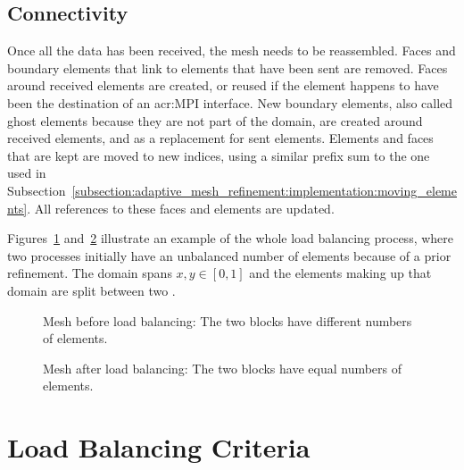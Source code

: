 \subsection{Connectivity}\label{subsection:load_balancing:reconstruction:connectivity}

Once all the data has been received, the mesh needs to be reassembled. Faces and boundary elements
that link to elements that have been sent are removed. Faces around received elements are created,
or reused if the element happens to have been the destination of an \acrshort{acr:MPI} interface.
New boundary elements, also called ghost elements because they are not part of the domain, are
created around received elements, and as a replacement for sent elements. Elements and faces that
are kept are moved to new indices, using a similar prefix sum to the one used in
Subsection~\ref{subsection:adaptive_mesh_refinement:implementation:moving_elements}. All references
to these faces and elements are updated.

Figures~\ref{fig:lb_before} and~\ref{fig:lb_after} illustrate an example of the whole load balancing
process, where two processes initially have an unbalanced number of elements because of a prior
refinement. The domain spans \(x, y \in [0, 1]\) and the elements making up that domain are split
between two . 

\begin{figure}[H]
    \centering
    \subfloat[Process 0]
    {\label{fig:lb_before_0}}
    \qquad
    \subfloat[Process 1]
    {\label{fig:lb_before_1}}
    \caption{Mesh before load balancing: The two blocks have different numbers of elements.}\label{fig:lb_before}
\end{figure}

\begin{figure}[H]
    \centering
    \subfloat[Process 0]
    {\label{fig:lb_after_0}}
    \qquad
    \subfloat[Process 1]
    {\label{fig:lb_after_1}}
    \caption{Mesh after load balancing: The two blocks have equal numbers of elements.}\label{fig:lb_after}
\end{figure}

\section{Load Balancing Criteria}\label{section:load_balancing:criteria}

